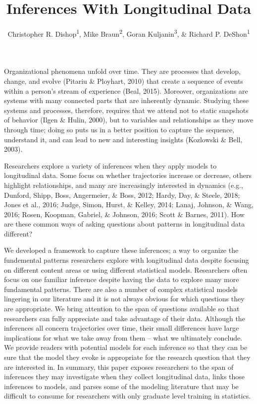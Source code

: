 \documentclass[english,,man]{apa6}
\title{Inferences With Longitudinal Data}
\author{Christopher R. Dishop\textsuperscript{1}, Mike Braun\textsuperscript{2},
Goran Kuljanin\textsuperscript{3}, \& Richard P.
DeShon\textsuperscript{1}}
\date{}
\affiliation{
\vspace{0.5cm}
\textsuperscript{1} Michigan State University\\\textsuperscript{2} University of South Florida\\\textsuperscript{3} DePaul University}
\theoremstyle{definition}
\theoremstyle{definition}
\theoremstyle{definition}
\theoremstyle{remark}
\begin{document}
\maketitle

Organizational phenomena unfold over time. They are processes that
develop, change, and evolve (Pitariu \& Ployhart, 2010) that create a
sequence of events within a person's stream of experience (Beal, 2015).
Moreover, organizations are systems with many connected parts that are
inherently dynamic. Studying these systems and processes, therefore,
requires that we attend not to static snapshots of behavior (Ilgen \&
Hulin, 2000), but to variables and relationships as they move through
time; doing so puts us in a better position to capture the sequence,
understand it, and can lead to new and interesting insights (Kozlowski
\& Bell, 2003).

Researchers explore a variety of inferences when they apply models to
longitudinal data. Some focus on whether trajectories increase or
decrease, others highlight relationships, and many are increasingly
interested in dynamics (e.g., Dunford, Shipp, Boss, Angermeier, \& Boss,
2012; Hardy, Day, \& Steele, 2018; Jones et al., 2016; Judge, Simon,
Hurst, \& Kelley, 2014; Lanaj, Johnson, \& Wang, 2016; Rosen, Koopman,
Gabriel, \& Johnson, 2016; Scott \& Barnes, 2011). How are these common
ways of asking questions about patterns in longitudinal data different?

We developed a framework to capture these inferences; a way to organize
the fundemental patterns researchers explore with longitudinal data
despite focusing on different content areas or using different
statistical models. Researchers often focus on one familiar inference
despite having the data to explore many more fundamental patterns. There
are also a number of complex statistical models lingering in our
literature and it is not always obvious for which questions they are
appropriate. We bring attention to the span of questions available so
that researchers can fully appreciate and take advantage of their data.
Although the inferences all concern trajectories over time, their small
differences have large implications for what we take away from them --
what we ultimately conclude. We provide readers with potential models
for each inference so that they can be sure that the model they evoke is
appropriate for the research question that they are interested in. In
summary, this paper exposes researchers to the span of inferences they
may investigate when they collect longitudinal data, links those
inferences to models, and parses some of the modeling literature that
may be difficult to consume for researchers with only graduate level
training in statistics.
\end{document}
